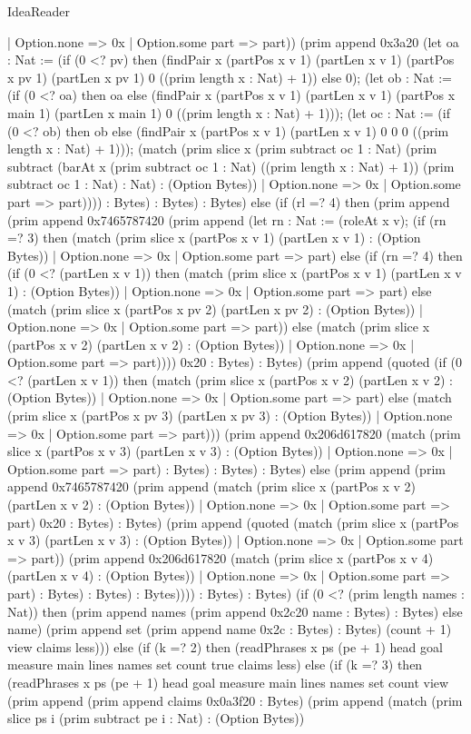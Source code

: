 \begin{lexlean}{IdeaReader}
\begin{semanticmodule}
{      | Option.none => 0x
      | Option.some part => part)) (prim append 0x3a20 (let oa : Nat := (if (0 <? pv) then (findPair x (partPos x v 1) (partLen x v 1) (partPos x pv 1) (partLen x pv 1) 0 ((prim length x : Nat) + 1)) else 0); (let ob : Nat := (if (0 <? oa) then oa else (findPair x (partPos x v 1) (partLen x v 1) (partPos x main 1) (partLen x main 1) 0 ((prim length x : Nat) + 1))); (let oc : Nat := (if (0 <? ob) then ob else (findPair x (partPos x v 1) (partLen x v 1) 0 0 0 ((prim length x : Nat) + 1))); (match (prim slice x (prim subtract oc 1 : Nat) (prim subtract (barAt x (prim subtract oc 1 : Nat) ((prim length x : Nat) + 1)) (prim subtract oc 1 : Nat) : Nat) : (Option Bytes))
      | Option.none => 0x
      | Option.some part => part)))) : Bytes) : Bytes) : Bytes) else (if (rl =? 4) then (prim append (prim append 0x7465787420 (prim append (let rn : Nat := (roleAt x v); (if (rn =? 3) then (match (prim slice x (partPos x v 1) (partLen x v 1) : (Option Bytes))
      | Option.none => 0x
      | Option.some part => part) else (if (rn =? 4) then (if (0 <? (partLen x v 1)) then (match (prim slice x (partPos x v 1) (partLen x v 1) : (Option Bytes))
      | Option.none => 0x
      | Option.some part => part) else (match (prim slice x (partPos x pv 2) (partLen x pv 2) : (Option Bytes))
      | Option.none => 0x
      | Option.some part => part)) else (match (prim slice x (partPos x v 2) (partLen x v 2) : (Option Bytes))
      | Option.none => 0x
      | Option.some part => part)))) 0x20 : Bytes) : Bytes) (prim append (quoted (if (0 <? (partLen x v 1)) then (match (prim slice x (partPos x v 2) (partLen x v 2) : (Option Bytes))
      | Option.none => 0x
      | Option.some part => part) else (match (prim slice x (partPos x pv 3) (partLen x pv 3) : (Option Bytes))
      | Option.none => 0x
      | Option.some part => part))) (prim append 0x206d617820 (match (prim slice x (partPos x v 3) (partLen x v 3) : (Option Bytes))
      | Option.none => 0x
      | Option.some part => part) : Bytes) : Bytes) : Bytes) else (prim append (prim append 0x7465787420 (prim append (match (prim slice x (partPos x v 2) (partLen x v 2) : (Option Bytes))
      | Option.none => 0x
      | Option.some part => part) 0x20 : Bytes) : Bytes) (prim append (quoted (match (prim slice x (partPos x v 3) (partLen x v 3) : (Option Bytes))
      | Option.none => 0x
      | Option.some part => part)) (prim append 0x206d617820 (match (prim slice x (partPos x v 4) (partLen x v 4) : (Option Bytes))
      | Option.none => 0x
      | Option.some part => part) : Bytes) : Bytes) : Bytes)))) : Bytes) : Bytes) (if (0 <? (prim length names : Nat)) then (prim append names (prim append 0x2c20 name : Bytes) : Bytes) else name) (prim append set (prim append name 0x2c : Bytes) : Bytes) (count + 1) view claims less))) else (if (k =? 2) then (readPhrases x ps (pe + 1) head goal measure main lines names set count true claims less) else (if (k =? 3) then (readPhrases x ps (pe + 1) head goal measure main lines names set count view (prim append (prim append claims 0x0a3f20 : Bytes) (prim append (match (prim slice ps i (prim subtract pe i : Nat) : (Option Bytes))
}
\end{semanticmodule}
\end{lexlean}
